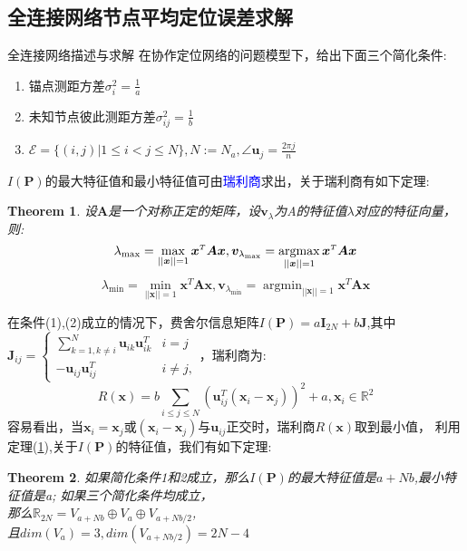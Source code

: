 \documentclass[notheorems,xetex,mathserif,serif]{beamer}
\DeclareMathOperator*{\rgmin}{argmin}
\newtheorem{theorem}{Theorem}
\newcommand{\transpose}[1]{\ensuremath{#1^{\scriptscriptstyle T}}}
\begin{document}
\subsection{全连接网络节点平均定位误差求解}
\begin{frame}{全连接网络描述与求解}
在协作定位网络的问题模型下，给出下面三个简化条件:
\begin{enumerate}
\item 锚点测距方差$\sigma_i^2=\frac{1}{a}$
\item 未知节点彼此测距方差$\sigma^2_{ij}=\frac{1}{b}$
\item $\mathcal{E}=\{(i,j)|1\leq i <j\leq N\},N:=N_a,\angle\bm{u}_j=\frac{2\pi j}{n}$
\end{enumerate}
$I(\bm{P})$的最大特征值和最小特征值可由\textcolor{blue}{瑞利商}求出，关于瑞利商有如下定理:
\begin{theorem}\label{theorem:rayleigh}
  设$\bm{A}$是一个对称正定的矩阵，设$\bm{v}_{\lambda}$为A的特征值$\lambda$对应的特征向量，则:
\[
\displaystyle\lambda_{\text{max}}=\max_{||\bm{x}||=1} \transpose{\bm{x}}\bm{A}\bm{x},\bm{v}_{\lambda_{\text{max}}}=\rgmax_{||\bm{x}||=1} \transpose{\bm{x}}\bm{A}\bm{x}
\]\[
\displaystyle\lambda_{\text{min}}=\min_{||\bm{x}||=1} \transpose{\bm{x}}\bm{A}\bm{x},\bm{v}_{\lambda_{\text{min}}}=\rgmin_{||\bm{x}||=1} \transpose{\bm{x}}\bm{A}\bm{x}
\]
\end{theorem}
\end{frame}
\begin{frame}
在条件(1),(2)成立的情况下，费舍尔信息矩阵$I(\bm{P})=a\bm{I}_{2N}+b\bm{J}$,其中$\bm{J}_{ij}=\begin{cases}
\sum_{k=1,k\neq i}^N \bm{u}_{ik}\bm{u}_{ik}^T&i=j\\
-\bm{u}_{ij}\bm{u}_{ij}^T&i\neq j,
\end{cases}$，瑞利商为:
\begin{equation}
R(\bm{x})=b\sum_{i\leq j\leq N} (\bm{u}_{ij}^T(\bm{x}_i-\bm{x}_j))^2+a,\bm{x}_i\in \mathbb{R}^2
\end{equation}
容易看出，当$\bm{x}_i=\bm{x}_j$或$(\bm{x}_i-\bm{x}_j)$与$\bm{u}_{ij}$正交时，瑞利商$R(\bm{x})$取到最小值，
利用定理(\ref{theorem:rayleigh}),关于$I(\bm{P})$的特征值，我们有如下定理:
\begin{theorem}
如果简化条件1和2成立，那么$I(\bm{P})$的最大特征值是$a+Nb$,最小特征值是a;
如果三个简化条件均成立，\\
那么$\mathbb{R}_{2N}=V_{a+Nb}\oplus V_a\oplus V_{a+Nb/2}$,
\\且$dim(V_a)=3,dim(V_{a+Nb/2})=2N-4$
\end{theorem}
\end{frame}
\end{document}
